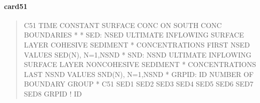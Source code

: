 \documentclass[letterpaper,10pt,english]{sphinxmanual}
\begin{document}
\paragraph{card51}
\label{\detokenize{inputfiles/runcontrol/card51:card51}}\label{\detokenize{inputfiles/runcontrol/card51::doc}}\begin{quote}

\begin{sphinxVerbatim}[commandchars=\\\{\}]
\PYGZhy{}\PYGZhy{}\PYGZhy{}\PYGZhy{}\PYGZhy{}\PYGZhy{}\PYGZhy{}\PYGZhy{}\PYGZhy{}\PYGZhy{}\PYGZhy{}\PYGZhy{}\PYGZhy{}\PYGZhy{}\PYGZhy{}\PYGZhy{}\PYGZhy{}\PYGZhy{}\PYGZhy{}\PYGZhy{}\PYGZhy{}\PYGZhy{}\PYGZhy{}\PYGZhy{}\PYGZhy{}\PYGZhy{}\PYGZhy{}\PYGZhy{}\PYGZhy{}\PYGZhy{}\PYGZhy{}\PYGZhy{}\PYGZhy{}\PYGZhy{}\PYGZhy{}\PYGZhy{}\PYGZhy{}\PYGZhy{}\PYGZhy{}\PYGZhy{}\PYGZhy{}\PYGZhy{}\PYGZhy{}\PYGZhy{}\PYGZhy{}\PYGZhy{}\PYGZhy{}\PYGZhy{}\PYGZhy{}\PYGZhy{}\PYGZhy{}\PYGZhy{}\PYGZhy{}\PYGZhy{}\PYGZhy{}\PYGZhy{}\PYGZhy{}\PYGZhy{}\PYGZhy{}\PYGZhy{}\PYGZhy{}\PYGZhy{}\PYGZhy{}\PYGZhy{}\PYGZhy{}\PYGZhy{}\PYGZhy{}\PYGZhy{}\PYGZhy{}\PYGZhy{}\PYGZhy{}\PYGZhy{}\PYGZhy{}\PYGZhy{}\PYGZhy{}\PYGZhy{}\PYGZhy{}\PYGZhy{}
C51 TIME CONSTANT SURFACE CONC ON SOUTH CONC BOUNDARIES
*
*    SED: NSED ULTIMATE INFLOWING SURFACE LAYER COHESIVE SEDIMENT
*         CONCENTRATIONS  FIRST NSED VALUES SED(N), N=1,NSND
*    SND: NSND ULTIMATE INFLOWING SURFACE LAYER NON\PYGZhy{}COHESIVE SEDIMENT
*         CONCENTRATIONS LAST NSND VALUES SND(N), N=1,NSND
*  GRPID: ID NUMBER OF BOUNDARY GROUP
*
C51      SED1      SED2      SED3      SED4      SED5      SED6      SED7      SED8      GRPID ! ID 
\end{sphinxVerbatim}
\end{quote}
\end{document}
